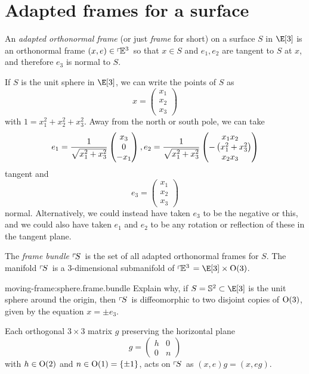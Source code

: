 \section{Adapted frames for a surface}
An \emph{adapted orthonormal frame}%
(or just \emph{frame} for short) on a surface \(S\) in \(\E[3]\) is an orthonormal frame \((x,e) \in \left\ulcorner\!\mathbb{E}^{3}\right.\) so that \(x \in S\) and \(e_1, e_2\) are tangent to \(S\) at \(x\), and therefore \(e_3\) is normal to \(S\).
\begin{example} 
If \(S\) is the unit sphere in \(\E[3]\), we can write the points of \(S\) as
\[
x
=
\begin{pmatrix}
x_1 \\
x_2 \\
x_3
\end{pmatrix}
\]
with \(1=x_1^2+x_2^2+x_3^2\).
Away from the north or south pole, we can take
\[
e_1
=
\frac{1}{\sqrt{x_1^2+x_3^2}}
\begin{pmatrix}
x_3 \\
0 \\
-x_1
\end{pmatrix},
e_2
=
\frac{1}{\sqrt{x_1^2+x_3^2}}
\begin{pmatrix}
x_1 x_2 \\
-\left(x_1^2+x_3^2\right) \\
x_2 x_3
\end{pmatrix}
\]
tangent and 
\[
 e_3=
 \begin{pmatrix}
  x_1 \\
  x_2 \\
  x_3
 \end{pmatrix}
\]
normal.
Alternatively, we could instead have taken \(e_3\) to be the negative or this, and we could also have taken \(e_1\) and \(e_2\) to be any rotation or reflection of these in the tangent plane.
\end{example}
The \emph{frame bundle}%
\(\left\ulcorner\!S\right.\) is the set of all adapted orthonormal frames for \(S\).
The manifold \(\left\ulcorner\!S\right.\) is a \(3\)-dimensional submanifold of \(\frameBundleE{3}=\E[3] \times \Orth{3}\).
\begin{problem}{moving-frame:sphere.frame.bundle}
Explain why, if \(S=\mathbb{S}^2 \subset \E[3]\) is the unit sphere around the origin, then \(\left\ulcorner\!S\right.\) is diffeomorphic to two disjoint copies of \(\textrm{O}\!\left(3\right)\), given by the equation \(x=\pm e_3\).
\end{problem}
Each orthogonal \(3\times 3\) matrix \(g\) preserving the horizontal plane
\[
 g=\begin{pmatrix}
    h & 0 \\
    0 & n
   \end{pmatrix}
\]
with \(h \in \textrm{O}\!\left(2\right)\) and \(n\in\textrm{O}\!\left(1\right)=\{\pm 1\}\), acts on \(\left\ulcorner\!S\right.\) as \((x,e)g=(x,eg)\).


